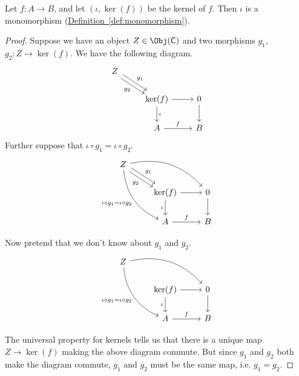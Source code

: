 \documentclass[main.tex]{subfiles}
\begin{document}
\begin{lemma}
  \label{lemma:canonicalinjectionismono}
  Let $f\colon A \to B$, and let $(\iota, \ker(f))$ be the kernel of $f$. Then $\iota$ is a monomorphism (\hyperref[def:monomorphism]{Definition~\ref*{def:monomorphism}}).
\end{lemma}
\begin{proof}
  Suppose we have an object $Z \in \Obj(\mathsf{C})$ and two morphisms $g_{1}$, $g_{2}\colon Z \to \ker(f)$. We have the following diagram.
  \begin{equation*}
    \begin{tikzcd}
      Z
      \arrow[rd, shift left, "g_{1}"]
      \arrow[rd, shift right, swap, "g_{2}"]
      \\
      & \ker(f)
      \arrow[r]
      \arrow[d, "\iota"]
      & 0
      \arrow[d]
      \\
      & A
      \arrow[r, "f"]
      & B
    \end{tikzcd}
  \end{equation*}
  Further suppose that $\iota \circ g_{1} = \iota \circ g_{2}$.
  \begin{equation*}
    \begin{tikzcd}
      Z
      \arrow[rd, shift left, "g_{1}"]
      \arrow[rd, shift right, swap, "g_{2}"]
      \arrow[rrd, bend left]
      \arrow[rdd, bend right, swap, "\iota \circ g_{1} = \iota \circ g_{2}"]
      \\
      & \ker(f)
      \arrow[r]
      \arrow[d, swap, "\iota"]
      & 0
      \arrow[d]
      \\
      & A
      \arrow[r, "f"]
      & B
    \end{tikzcd}
  \end{equation*}

  Now pretend that we don't know about $g_{1}$ and $g_{2}$.
  \begin{equation*}
    \begin{tikzcd}
      Z
      \arrow[rrd, bend left]
      \arrow[rdd, bend right, swap, "\iota \circ g_{1} = \iota \circ g_{2}"]
      \\
      & \ker(f)
      \arrow[r]
      \arrow[d, swap, "\iota"]
      & 0
      \arrow[d]
      \\
      & A
      \arrow[r, "f"]
      & B
    \end{tikzcd}
  \end{equation*}

  The universal property for kernels tells us that there is a unique map $Z \to \ker(f)$ making the above diagram commute. But since $g_{1}$ and $g_{2}$ both make the diagram commute, $g_{1}$ and $g_{2}$ must be the same map, i.e. $g_{1} = g_{2}$.
\end{proof}
\end{document}
